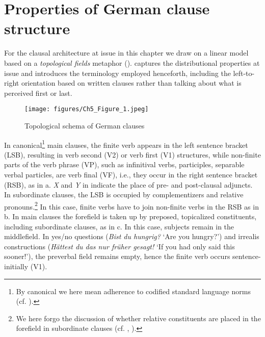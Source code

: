 \documentclass[output=paper]{langscibook}
\begin{document}
\section{Properties of German clause structure}\label{sec:tsehaye:2}

For the clausal architecture at issue in this chapter we draw on a linear model based on a \textit{topological fields} metaphor (\citealt{Drach1963, Höhle1986, Wöllstein2014}).  captures the distributional properties at issue and introduces the terminology employed henceforth, including the left-to-right orientation based on written clauses rather than talking about what is perceived first or last. 


\begin{figure}
\texttt{[image: figures/Ch5\_Figure\_1.jpeg]}
\caption{Topological schema of German clauses}
\label{fig:tsehaye:1}
\end{figure}

In canonical{\footnote{By canonical we here mean adherence to codified standard language norms (cf. ).}} main clauses, the finite verb appears in the left sentence bracket (LSB), resulting in verb second (V2) or verb first (V1) structures, while non-finite parts of the verb phrase (VP), such as infinitival verbs, participles, separable verbal particles, are verb final (VF), i.e., they occur in the right sentence bracket (RSB), as in a. \textit{X} and \textit{Y} in  indicate the place of pre- and post-clausal adjuncts. In subordinate clauses, the LSB is occupied by complementizers and relative pronouns.\footnote{We here forgo the discussion of whether relative constituents are placed in the forefield in subordinate clauses (cf. \citealt[214]{Imo2016}, \citealt[27ff]{Wöllstein2014}).} In this case, finite verbs have to join non-finite verbs in the RSB as in b. In main clauses the forefield is taken up by preposed, topicalized constituents, including subordinate clauses, as in c. In this case, subjects remain in the middlefield. In yes/no questions (\textit{Bist du hungrig?} ‘Are you hungry?’) and irrealis constructions (\textit{Hättest du das nur früher gesagt!} ‘If you had only said this sooner!’), the preverbal field remains empty, hence the finite verb occurs sentence-initially (V1).
\end{document}
